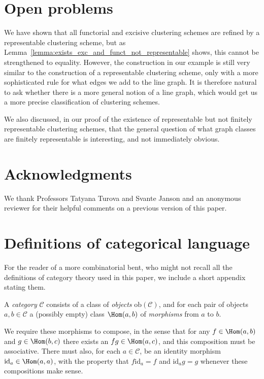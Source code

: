 \documentclass[a4paper,reqno,oneside]{article} %
\begin{document}
\section{Open problems}
We have shown that all functorial and excisive clustering schemes are refined by a representable clustering scheme, but as Lemma~\ref{lemma:exists_exc_and_funct_not_representable} shows, this cannot be strengthened to equality. However, the construction in our example is still very similar to the construction of a representable clustering scheme, only with a more sophisticated rule for what edges we add to the line graph. It is therefore natural to ask whether there is a more general notion of a line graph, which would get us a more precise classification of clustering schemes.

We also discussed, in our proof of the existence of representable but not finitely representable clustering schemes, that the general question of what graph classes are finitely representable is interesting, and not immediately obvious.

\section*{Acknowledgments}

We thank Professors Tatyana Turova and Svante Janson and an anonymous reviewer for their helpful comments on a previous version of this paper.

\printbibliography

\appendix

\section{Definitions of categorical language}\label{cat_theory_appendix}

For the reader of a more combinatorial bent, who might not recall all the definitions of category theory used in this paper, we include a short appendix stating them.

\begin{definition}
    A \emph{category} $\mathcal{C}$ consists of a class of \emph{objects} $\mathrm{ob}(\mathcal{C})$, and for each pair of objects $a, b \in \mathcal{C}$ a (possibly empty) class $\Hom(a,b)$ of \emph{morphisms} from $a$ to $b$. 
    
    We require these morphisms to compose, in the sense that for any $f \in \Hom(a,b)$ and $g \in \Hom(b,c)$ there exists an $fg \in \Hom(a,c)$, and this composition must be associative. There must also, for each $a \in \mathcal{C}$, be an identity morphism $\mathrm{id}_a \in \Hom(a,a)$, with the property that $f\mathrm{id}_a = f$ and $\mathrm{id}_a g = g$ whenever these compositions make sense.
\end{definition}
\end{document}
